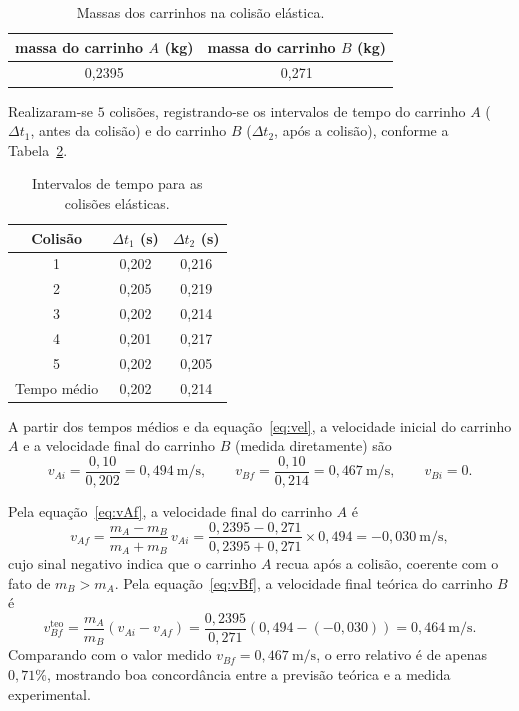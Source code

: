 \documentclass[12pt,a4paper]{article}
\begin{document}
\begin{table}[!h]
	\centering
	\begin{tabular}{|c|c|} \hline \hline
	massa do carrinho $A$ (kg) & massa do carrinho $B$ (kg) \\ \hline \hline
	0,2395 & 0,271 \\ \hline \hline
	\end{tabular}
	\caption{Massas dos carrinhos na colisão elástica.}
	\label{tab:massas-el}
\end{table}

Realizaram-se $5$ colisões, registrando-se os intervalos de tempo do carrinho $A$
($\Delta t_1$, antes da colisão) e do carrinho $B$ ($\Delta t_2$, após a colisão), conforme a
Tabela~\ref{tab:tempos-el}.

\begin{table}[!h]
	\centering
	\begin{tabular}{|c|c|c|} \hline \hline
	Colisão & $\Delta t_1$ (s) & $\Delta t_2$ (s) \\ \hline \hline
	1 & 0,202 & 0,216 \\ \hline
	2 & 0,205 & 0,219 \\ \hline
	3 & 0,202 & 0,214 \\ \hline
	4 & 0,201 & 0,217 \\ \hline
	5 & 0,202 & 0,205 \\ \hline
	Tempo médio & 0,202 & 0,214 \\ \hline \hline
	\end{tabular}
	\caption{Intervalos de tempo para as colisões elásticas.}
	\label{tab:tempos-el}
\end{table}

A partir dos tempos médios e da equação~\eqref{eq:vel}, a velocidade inicial do carrinho $A$ e a
velocidade final do carrinho $B$ (medida diretamente) são
\[
v_{Ai} = \frac{0{,}10}{0{,}202} = 0{,}494~\mathrm{m/s}, \qquad
v_{Bf} = \frac{0{,}10}{0{,}214} = 0{,}467~\mathrm{m/s}, \qquad v_{Bi} = 0.
\]

Pela equação~\eqref{eq:vAf}, a velocidade final do carrinho $A$ é
\[
v_{Af} = \frac{m_A - m_B}{m_A + m_B}\, v_{Ai}
       = \frac{0{,}2395 - 0{,}271}{0{,}2395 + 0{,}271}\times 0{,}494
       = -0{,}030~\mathrm{m/s},
\]
cujo sinal negativo indica que o carrinho $A$ recua após a colisão, coerente com o fato de
$m_B > m_A$. Pela equação~\eqref{eq:vBf}, a velocidade final teórica do carrinho $B$ é
\[
v_{Bf}^{\text{teo}} = \frac{m_A}{m_B}\left(v_{Ai} - v_{Af}\right)
       = \frac{0{,}2395}{0{,}271}\left(0{,}494 - (-0{,}030)\right) = 0{,}464~\mathrm{m/s}.
\]
Comparando com o valor medido $v_{Bf} = 0{,}467~\mathrm{m/s}$, o erro relativo é de apenas
$0{,}71\%$, mostrando boa concordância entre a previsão teórica e a medida experimental.
\end{document}
